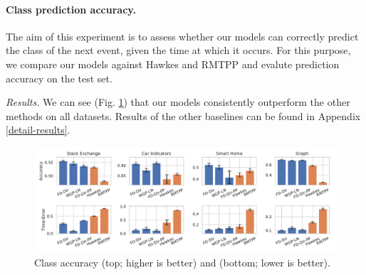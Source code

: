 \vspace{3mm}
\paragraph{Class prediction accuracy.} The aim of this experiment is to assess whether our models can correctly predict the class of the next event, given the time at which it occurs. For this purpose, we compare our models against Hawkes and RMTPP and evalute prediction accuracy on the test set.

\textit{Results.} We can see (Fig. \ref{fig:accuracy}) that our models consistently outperform the other methods on all datasets. Results of the other baselines can be found in Appendix \ref{detail-results}.


\begin{figure}
\centering
    \includegraphics[width=\linewidth]{sections/010_neurips2019/paper/images/accuracy-final.pdf}
    \vspace*{-0.7cm}
    \caption{Class accuracy (top; higher is better) and \TimeScore (bottom; lower is better).}
    \label{fig:accuracy}
    \vspace*{-0.3cm}
\end{figure}
